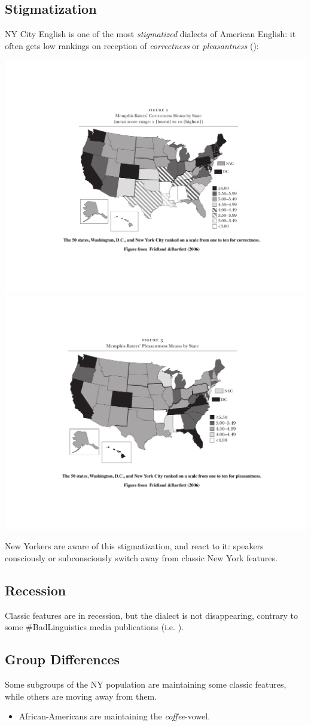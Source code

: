 \documentclass[11pt]{article}
\newcommand{\1}{$'$}
\newcommand{\2}{$''$}
\newcommand{\3}{$'''$}
\begin{document}
\subsection{Stigmatization}

NY City English is one of the most \emph{stigmatized} dialects of American English: it often gets low rankings on reception of \emph{correctness} or \emph{pleasantness} (\citealp{FridlandBartless:2006}):

\includegraphics[width=.45\textwidth]{ratings1}\vrule\includegraphics[width=.45\textwidth]{ratings2}

\noindent New Yorkers are aware of this stigmatization, and react to it: speakers consciously or subconsciously switch away from classic New York features.

\subsection{Recession}

Classic features are in recession, but the dialect is not disappearing, contrary to some \#BadLinguistics media publications (i.e. \citealp{Fuhgeddaboudit:2015}).

\subsection{Group Differences}

Some subgroups of the NY population are maintaining some classic features, while others are moving away from them.

\begin{itemize}
\item African-Americans are maintaining the \emph{coffee}-vowel.	
\end{itemize}
\end{document}
